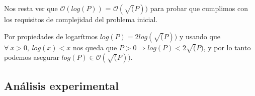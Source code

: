 	Nos resta ver que $\mathcal{O} (log(P))$ = $\mathcal{O} (\sqrt(P))$ para probar que cumplimos con los requisitos de complejidad del problema inicial.
	
	Por propiedades de logarítmos $log(P) = 2log(\sqrt(P))$ y usando que $\forall \ x > 0, \ log(x) < x$ nos queda que $ P > 0 \Longrightarrow log(P) < 2\sqrt(P)$, y por lo tanto podemos asegurar $log(P) \in \mathcal{O} (\sqrt(P))$. 

\subsection{Análisis experimental}

\newpage
